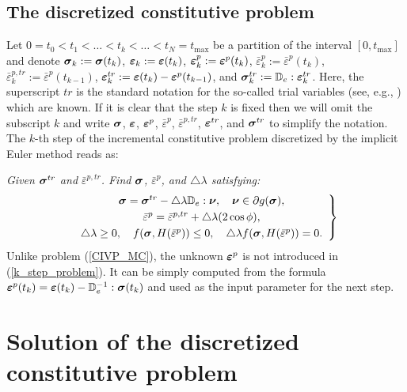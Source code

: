 \documentclass[a4paper,12pt]{article}
\theoremstyle{remark}
\newcommand{\mbf}[1]{\mbox{\boldmath$#1$}}
\numberwithin{equation}{section}
\begin{document}
\subsection{The discretized constitutive problem}

Let $0=t_0<t_1<\ldots<t_k<\ldots<t_N=t_{\max}$ be a partition of the interval $[0,t_{\max}]$ and denote $\mbf{\sigma}_k:=\mbf{\sigma}(t_k)$, $\mbf\varepsilon_k:=\mbf\varepsilon(t_k)$, $\mbf\varepsilon^p_k:=\mbf\varepsilon^p(t_k)$, $\bar\varepsilon^p_k:=\bar\varepsilon^p(t_k)$, $\bar{\varepsilon}^{p,tr}_k:=\bar{\varepsilon}^p(t_{k-1})$, $\mbf\varepsilon^{tr}_k:=\mbf\varepsilon(t_{k})-\mbf{\varepsilon}^p(t_{k-1})$, and $\mbf{\sigma}^{tr}_k:=\mathbb D_e:\mbf\varepsilon^{tr}_k$. Here, the superscript $tr$ is the standard notation for the so-called trial variables (see, e.g., \cite{NPO08}) which are known. If it is clear that the step $k$ is fixed then we will omit the subscript $k$ and write $\mbf{\sigma}$, $\mbf\varepsilon$, $\mbf\varepsilon^p$, $\bar\varepsilon^p$, $\bar{\varepsilon}^{p,tr}$, $\mbf\varepsilon^{tr}$, and $\mbf{\sigma}^{tr}$ to simplify the notation. The $k$-th step of the incremental constitutive problem discretized by the implicit Euler method reads as: 

\medskip\noindent
{\it Given $\mbf{\sigma}^{tr}$ and $\bar{\varepsilon}^{p,tr}$. Find $\mbf{\sigma}$,  $\bar{\varepsilon}^p$, and $\triangle\lambda$ satisfying:}
\begin{equation}
\left.
\begin{array}{c}
\mbf{\sigma}=\mbf{\sigma}^{tr}-\triangle\lambda\mathbb D_e:\mbf\nu,\quad \mbf\nu\in\partial g(\mbf\sigma),\\[1mm]
\bar{\varepsilon}^p=\bar{\varepsilon}^{p,tr}+\triangle\lambda (2\cos\phi),\\[1mm]
\triangle\lambda\geq0,\quad f(\mbf{\sigma},H(\bar\varepsilon^p))\leq0,\quad \triangle\lambda f(\mbf{\sigma},H(\bar\varepsilon^p))=0.
\end{array}
\right\}
\label{k_step_problem}
\end{equation}
Unlike problem (\ref{CIVP_MC}), the unknown $\mbf\varepsilon^p$ is not introduced in (\ref{k_step_problem}). It can be simply computed from the formula $\mbf{\varepsilon}^p(t_k)=\mbf{\varepsilon}(t_k)-\mathbb D_e^{-1}:\mbf{\sigma}(t_k)$ and used as the input parameter for the next step.



\section{Solution of the discretized constitutive problem}
\label{sec_time_discret}
\end{document}
